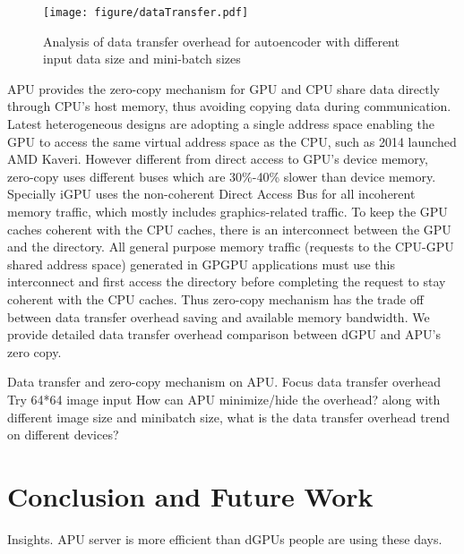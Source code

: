 \documentclass{article}
\begin{document}

\begin{figure}[h]
\centering
\texttt{[image: figure/dataTransfer.pdf]}
\caption{Analysis of data transfer overhead for autoencoder with different input data size and mini-batch sizes}
\label{fig:datatransfer}
\end{figure}



APU provides the zero-copy mechanism \cite{AMDguide} for GPU and CPU share data directly through CPU's host memory, thus avoiding copying data during
communication.
Latest heterogeneous designs are adopting a single address space enabling the GPU to access the
same virtual address space as the CPU, such as 2014 launched AMD Kaveri\cite{Kaveri}.
However different from direct access to GPU's device memory, zero-copy uses different buses which are 30\%-40\% slower than device memory\cite{junli2013, AMDguide}.
Specially iGPU uses the non-coherent Direct Access Bus for all incoherent memory traffic, which mostly includes graphics-related traffic.
To keep the GPU caches coherent with the CPU caches, there is an interconnect between the GPU and the directory. All general purpose memory traffic (requests to the CPU-GPU shared address space) generated in GPGPU applications must use this interconnect and first access the directory before completing the request to stay coherent with the CPU caches.
Thus zero-copy mechanism has the trade off between data transfer overhead saving and available memory bandwidth.
We provide detailed data transfer overhead comparison between dGPU and APU's zero copy.

Data transfer and zero-copy mechanism on APU.
Focus data transfer overhead
Try 64*64 image input
How can APU minimize/hide the overhead?
along with different image size and minibatch size, what is the data transfer overhead trend on different devices?

\section{Conclusion and Future Work}

Insights.
APU server is more efficient than dGPUs people are using these days.


\end{document}
